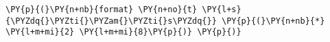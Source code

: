 \begin{Verbatim}[commandchars=\\\{\}]
\PY{p}{(}\PY{n+nb}{format} \PY{n+no}{t} \PY{l+s}{\PYZdq{}\PYZti{}\PYZam{}\PYZti{}s\PYZdq{}} \PY{p}{(}\PY{n+nb}{*} \PY{l+m+mi}{2} \PY{l+m+mi}{8}\PY{p}{)} \PY{p}{)}
\end{Verbatim}
